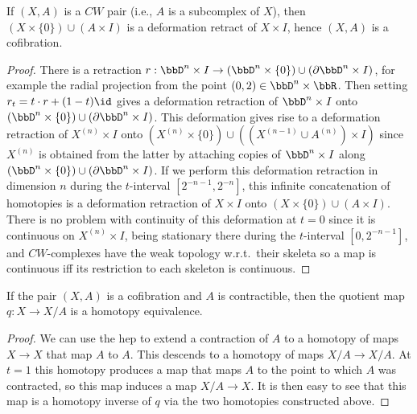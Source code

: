 \begin{prop}\label{prop 0.16 Hatcher}
    If $(X,A)$ is a $CW$ pair (i.e., $A$ is a subcomplex of $X$), then $(X\times\{0\})\cup (A\times I)$ is a deformation retract of $X\times I$, hence $(X,A)$ is a cofibration.
\end{prop}
\begin{proof}
    There is a retraction $r:\bbD^n\times I\to (\bbD^n\times\{0\})\cup (\partial \bbD^n\times I)$, for example the radial projection from the point $(0,2)\in \bbD^n\times \bbR$. Then setting $r_t=t\cdot r+(1-t)\id$ gives a deformation retraction of $\bbD^n\times I$ onto $(\bbD^n\times\{0\})\cup (\partial \bbD^n\times I)$. This deformation gives rise to a deformation retraction of $X^{(n)}\times I$ onto $(X^{(n)}\times\{0\})\cup ((X^{(n-1)}\cup A^{(n)})\times I)$ since $X^{(n)}$ is obtained from the latter by attaching copies of $\bbD^n\times I$ along $(\bbD^n\times\{0\})\cup (\partial \bbD^n\times I)$. If we perform this deformation retraction in dimension $n$ during the $t$-interval $[2^{-n-1},2^{-n}]$, this infinite concatenation of homotopies is a deformation retraction of $X\times I$ onto $(X\times\{0\})\cup (A\times I)$. There is no problem with continuity of this deformation at $t=0$ since it is continuous on $X^{(n)}\times I$, being stationary there during the $t$-interval $[0,2^{-n-1}]$, and $CW$-complexes have the weak topology w.r.t.\ their skeleta so a map is continuous iff its restriction to each skeleton is continuous.
\end{proof}

\begin{prop}
    If the pair $(X,A)$ is a cofibration and $A$ is contractible, then the quotient map $q:X\to X\slash A$ is a homotopy equivalence.
\end{prop}
\begin{proof}
    We can use the \gls{hep} to extend a contraction of $A$ to a homotopy of maps $X\to X$ that map $A$ to $A$. This descends to a homotopy of maps $X\slash A\to X\slash A$. At $t=1$ this homotopy produces a map that maps $A$ to the point to which $A$ was contracted, so this map induces a map $X\slash A\to X$. It is then easy to see that this map is a homotopy inverse of $q$ via the two homotopies constructed above.
\end{proof}

